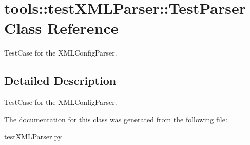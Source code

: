 \hypertarget{classtools_1_1testXMLParser_1_1TestParser}{
\section{tools::testXMLParser::TestParser Class Reference}
\label{classtools_1_1testXMLParser_1_1TestParser}
}
TestCase for the XMLConfigParser.  




\subsection{Detailed Description}
TestCase for the XMLConfigParser. 

The documentation for this class was generated from the following file:\begin{CompactItemize}
\item 
testXMLParser.py\end{CompactItemize}
